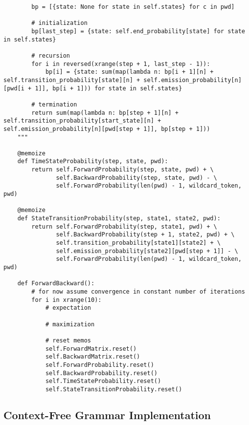 \documentclass{amsart}
\theoremstyle{definition}
\theoremstyle{remark}
\numberwithin{equation}{section}
\begin{document}
\begin{lstlisting}
        bp = [{state: None for state in self.states} for c in pwd]

        # initialization
        bp[last_step] = {state: self.end_probability[state] for state in self.states}

        # recursion
        for i in reversed(xrange(step + 1, last_step - 1)):
            bp[i] = {state: sum(map(lambda n: bp[i + 1][n] + self.transition_probability[state][n] + self.emission_probability[n][pwd[i + 1]], bp[i + 1])) for state in self.states}

        # termination
        return sum(map(lambda n: bp[step + 1][n] + self.transition_probability[start_state][n] + self.emission_probability[n][pwd[step + 1]], bp[step + 1]))
    """
        
    @memoize
    def TimeStateProbability(step, state, pwd):
        return self.ForwardProbability(step, state, pwd) + \
               self.BackwardProbability(step, state, pwd) - \
               self.ForwardProbability(len(pwd) - 1, wildcard_token, pwd)

    @memoize
    def StateTransitionProbability(step, state1, state2, pwd):
        return self.ForwardProbability(step, state1, pwd) + \
               self.BackwardProbability(step + 1, state2, pwd) + \
               self.transition_probability[state1][state2] + \
               self.emission_probability[state2][pwd[step + 1]] - \
               self.ForwardProbability(len(pwd) - 1, wildcard_token, pwd)

    def ForwardBackward():
        # for now assume convergence in constant number of iterations
        for i in xrange(10):
            # expectation 
            
            # maximization
        
            # reset memos
            self.ForwardMatrix.reset()
            self.BackwardMatrix.reset()
            self.ForwardProbability.reset()
            self.BackwardProbability.reset()
            self.TimeStateProbability.reset()
            self.StateTransitionProbability.reset()
\end{lstlisting}
\subsection{Context-Free Grammar Implementation}
\end{document}
